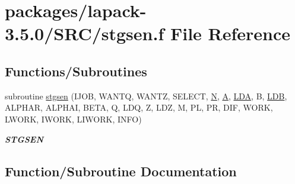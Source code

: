 \hypertarget{stgsen_8f}{}\section{packages/lapack-\/3.5.0/\+S\+R\+C/stgsen.f File Reference}
\label{stgsen_8f}
\subsection*{Functions/\+Subroutines}
\begin{DoxyCompactItemize}
\item 
subroutine \hyperlink{stgsen_8f_a4f229aaf6520b747952147327f94a0d3}{stgsen} (I\+J\+O\+B, W\+A\+N\+T\+Q, W\+A\+N\+T\+Z, S\+E\+L\+E\+C\+T, \hyperlink{polmisc_8c_a0240ac851181b84ac374872dc5434ee4}{N}, \hyperlink{classA}{A}, \hyperlink{example__user_8c_ae946da542ce0db94dced19b2ecefd1aa}{L\+D\+A}, B, \hyperlink{example__user_8c_a50e90a7104df172b5a89a06c47fcca04}{L\+D\+B}, A\+L\+P\+H\+A\+R, A\+L\+P\+H\+A\+I, B\+E\+T\+A, Q, L\+D\+Q, Z, L\+D\+Z, M, P\+L, P\+R, D\+I\+F, W\+O\+R\+K, L\+W\+O\+R\+K, I\+W\+O\+R\+K, L\+I\+W\+O\+R\+K, I\+N\+F\+O)
\begin{DoxyCompactList}\small\item\em {\bfseries S\+T\+G\+S\+E\+N} \end{DoxyCompactList}\end{DoxyCompactItemize}


\subsection{Function/\+Subroutine Documentation}
\hypertarget{stgsen_8f_a4f229aaf6520b747952147327f94a0d3}{}

